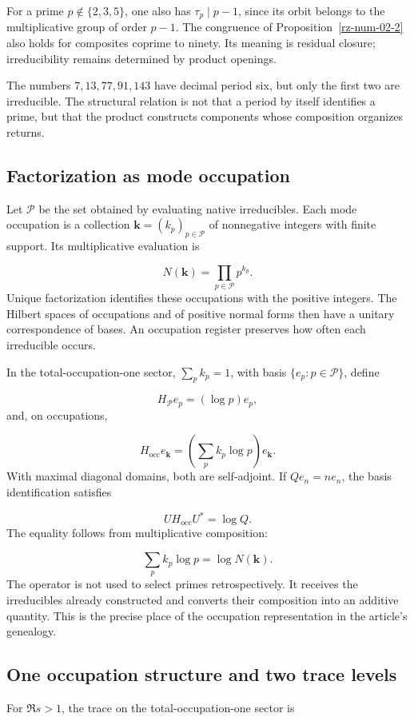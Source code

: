 For a prime $p\notin\{2,3,5\}$, one also has $\tau_p\mid p-1$, since its orbit belongs to the multiplicative group of order $p-1$. The congruence of Proposition~\ref{rz-num-02-2} also holds for composites coprime to ninety. Its meaning is residual closure; irreducibility remains determined by product openings.

The numbers $7,13,77,91,143$ have decimal period six, but only the first two are irreducible. The structural relation is not that a period by itself identifies a prime, but that the product constructs components whose composition organizes returns.

\subsection{Factorization as mode occupation}
Let $\mathcal P$ be the set obtained by evaluating native irreducibles. Each mode occupation is a collection $\mathbf k=(k_p)_{p\in\mathcal P}$ of nonnegative integers with finite support. Its multiplicative evaluation is

\[
N(\mathbf k)=\prod_{p\in\mathcal P}p^{k_p}.
\]
Unique factorization identifies these occupations with the positive integers. The Hilbert spaces of occupations and of positive normal forms then have a unitary correspondence of bases. An occupation register preserves how often each irreducible occurs.

In the total-occupation-one sector, \(\sum_p k_p=1\), with basis \(\{e_p:p\in\mathcal P\}\), define

\[
H_{\mathcal P}e_p=(\log p)e_p,
\]
and, on occupations,

\[
H_{\mathrm{occ}}e_{\mathbf k}
=\left(\sum_pk_p\log p\right)e_{\mathbf k}.
\]
With maximal diagonal domains, both are self-adjoint. If $Qe_n=ne_n$, the basis identification satisfies

\[
U H_{\mathrm{occ}}U^*=\log Q.
\]
The equality follows from multiplicative composition:

\[
\sum_pk_p\log p=\log N(\mathbf k).
\]
The operator is not used to select primes retrospectively. It receives the irreducibles already constructed and converts their composition into an additive quantity. This is the precise place of the occupation representation in the article's genealogy.

\subsection{One occupation structure and two trace levels}
For $\Re s>1$, the trace on the total-occupation-one sector is

